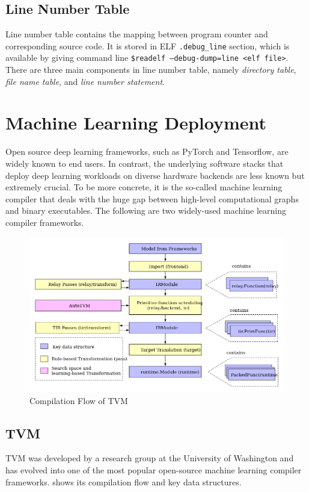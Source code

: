 \subsection{Line Number Table}
\label{sec:line_table}

Line number table contains the mapping between program counter and corresponding source code. It is stored in \ac{ELF} \texttt{.debug\_line} section, which is available by giving command line \texttt{\$readelf --debug-dump=line <elf file>}. There are three main components in line number table, namely \textit{directory table}, \textit{file name table}, and \textit{line number statement}.




\section{Machine Learning Deployment}
Open source deep learning frameworks, such as PyTorch and Tensorflow, are widely known to end users. In contrast, the underlying software stacks that deploy deep learning workloads on diverse hardware backends are less known but extremely crucial. To be more concrete, it is the so-called machine learning compiler that deals with the huge gap between high-level computational graphs and binary executables. The following are two widely-used machine learning compiler frameworks.

\begin{figure}[ht]
    \centering
    \includegraphics[width=\linewidth]{figures/TVM_compilation_flow.png}
    \caption{Compilation Flow of TVM}
    \label{fig:tvm_compilation_flow}
\end{figure}

\subsection{TVM}
TVM was developed by a research group at the University of Washington and has evolved into one of the most popular open-source machine learning compiler frameworks.  shows its compilation flow and key data structures.

